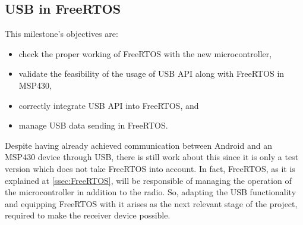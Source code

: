 	\subsection{USB in FreeRTOS}
	\label{ssec:USB.FreeRTOS}	
		This milestone's objectives are:
		\begin{itemize}
			\item check the proper working of FreeRTOS with the new microcontroller,
			\item validate the feasibility of the usage of USB API along with FreeRTOS in MSP430,
			\item correctly integrate USB API into FreeRTOS, and
			\item manage USB data sending in FreeRTOS.
		\end{itemize}

		Despite having already achieved communication between Android and an MSP430 device through USB, there is
		still work about this since it is only a test version which does not take FreeRTOS into account. In fact,
		FreeRTOS, as it is explained at \autoref{ssec:FreeRTOS}, will be responsible of managing the operation of
		the microcontroller in addition to the radio. So, adapting the USB functionality and equipping FreeRTOS
		with it arises as the next relevant stage of the project, required to make the receiver device possible.\\

